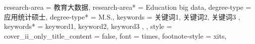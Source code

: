 {{      %
    research-area = {教育大数据},
    research-area* = {Education big data},
    degree-type = {应用统计硕士},
    degree-type* = {M.S.},
    keywords = {
      关键词1,
      关键词2,
      关键词3
    },
    keywords* = {
      keyword1,
      keyword2,
      keyword3
    },
  },
  style = {
    cover_ii_only_title_content = false,
    font = times,
    footnote-style = xits,
}}
